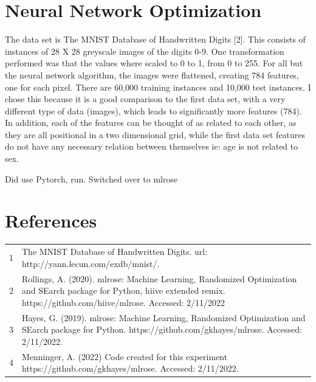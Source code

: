 \documentclass[letterpaper]{article} %
\begin{document}
\section{Neural Network Optimization}

The data set is The MNIST Database of Handwritten Digits [2].  This consists of instances of 28 X 28 greyscale images of the digits 0-9.  One transformation performed was that the values where scaled to 0 to 1, from 0 to 255.  For all but the neural network algorithm,  the images were flattened, creating 784 features, one for each pixel.  There are 60,000 training instances and 10,000 test instances.  I chose this because it is a good comparison to the first data set, with a very different type of data (images), which leads to significantly more features (784).  In addition, each of the features can be thought of as related to each other, as they are all positional in a two dimensional grid, while the first data set features do not have any necessary relation between themselves ie:  age is not related to sex.  

Did use Pytorch, run.  Switched over to mlrose


\section{References}
\begin{tabular}{l p{2.75in}}
\\
1 & The MNIST Database of Handwritten Digits. url: http://yann.lecun.com/exdb/mnist/.
\\
2 & Rollings, A. (2020). mlrose: Machine Learning, Randomized Optimization and SEarch package for Python, hiive extended remix. https://github.com/hiive/mlrose. Accessed: 2/11/2022
\\
3 & Hayes, G. (2019). mlrose: Machine Learning, Randomized Optimization and SEarch package for Python. https://github.com/gkhayes/mlrose. Accessed: 2/11/2022.
\\
4 & Menninger, A. (2022)  Code created for this experiment https://github.com/gkhayes/mlrose. Accessed: 2/11/2022.
\end{tabular}
\end{document}
